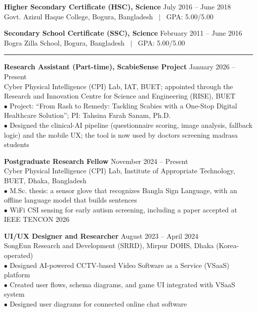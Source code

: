 \documentclass[11pt,a4paper]{article}
\renewcommand{\section}[1]{%
    \par\vspace{6pt}%
    \pagebreak[0]%
    \noindent{\large\bfseries\scshape #1}%
    \vspace{2pt}%
    \hrule%
    \vspace{6pt}%
    \nopagebreak[4]%
}
\begin{document}
\vspace{6pt}
\noindent\textbf{Higher Secondary Certificate (HSC), Science} \hfill July 2016 -- June 2018\\
Govt. Azizul Haque College, Bogura, Bangladesh ~$|$~ GPA: 5.00/5.00

\vspace{6pt}
\noindent\textbf{Secondary School Certificate (SSC), Science} \hfill February 2011 -- June 2016\\
Bogra Zilla School, Bogura, Bangladesh ~$|$~ GPA: 5.00/5.00

\section{Professional Experience}

\noindent\textbf{Research Assistant (Part-time), ScabieSense Project} \hfill January 2026 -- Present\\
Cyber Physical Intelligence (CPI) Lab, IAT, BUET; appointed through the Research and Innovation Centre for Science and Engineering (RISE), BUET\\
$\bullet$ Project: ``From Rash to Remedy: Tackling Scabies with a One-Stop Digital Healthcare Solution''; PI: Tahsina Farah Sanam, Ph.D.\\
$\bullet$ Designed the clinical-AI pipeline (questionnaire scoring, image analysis, fallback logic) and the mobile UX; the tool is now used by doctors screening madrasa students

\vspace{6pt}
\noindent\textbf{Postgraduate Research Fellow} \hfill November 2024 -- Present\\
Cyber Physical Intelligence (CPI) Lab, Institute of Appropriate Technology, BUET, Dhaka, Bangladesh\\
$\bullet$ M.Sc. thesis: a sensor glove that recognizes Bangla Sign Language, with an offline language model that builds sentences\\
$\bullet$ WiFi CSI sensing for early autism screening, including a paper accepted at IEEE TENCON 2026

\vspace{6pt}
\noindent\textbf{UI/UX Designer and Researcher} \hfill August 2023 -- April 2024\\
SongEun Research and Development (SRRD), Mirpur DOHS, Dhaka (Korea-operated)\\
$\bullet$ Designed AI-powered CCTV-based Video Software as a Service (VSaaS) platform\\
$\bullet$ Created user flows, schema diagrams, and game UI integrated with VSaaS system\\
$\bullet$ Designed user diagrams for connected online chat software
\end{document}
